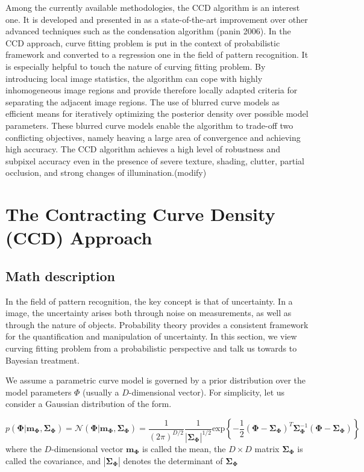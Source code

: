 Among the currently available methodologies, the CCD algorithm is an
interest one. It is developed and presented in as a state-of-the-art
improvement over other advanced techniques such as the condensation
algorithm (panin 2006). In the CCD approach, curve fitting problem is
put in the context of probabilistic framework and converted to a
regression one in the field of pattern recognition. It is especially
helpful to touch the nature of curving fitting problem. By introducing
local image statistics, the algorithm can cope with highly
inhomogeneous image regions and provide therefore locally adapted
criteria for separating the adjacent image regions. The use of blurred
curve models as efficient means for iteratively optimizing the
posterior density over possible model parameters. These blurred curve
models enable the algorithm to trade-off two conflicting objectives,
namely heaving a large area of convergence and achieving high
accuracy. The CCD algorithm achieves a high level of robustness and subpixel
accuracy even in the presence of severe texture, shading, clutter,
partial occlusion, and strong changes of illumination.(modify)



\section{The Contracting Curve Density (CCD) Approach}
\label{sec:sketch}

\subsection{Math description}
\label{sec:md}

In the field of pattern recognition, the key concept is that of
uncertainty. In a image, the uncertainty arises both
through noise on measurements, as well as through the nature of
objects. Probability theory provides a consistent framework for the
quantification and manipulation of uncertainty.  In this section, we
view curving fitting problem from a probabilistic perspective and talk
us towards to Bayesian treatment.

We assume a parametric curve model is governed by a prior distribution
over the model parameters $\Phi$ (usually a $D$-dimensional vector). For simplicity, let us consider a
Gaussian distribution of the form.

\begin{equation}
  \label{eq:1.1}
  p(\mathbf{\Phi} | \mathbf{m}_{\mathbf{\Phi}}, \mathbf{\mathbf{\Sigma}}_{\mathbf{\Phi}}) = \mathcal{N}(\mathbf{\Phi} |
  \mathbf{m}_{\mathbf{\Phi}},\mathbf{\Sigma}_{\mathbf{\Phi}}) =
  \frac{1}{(2\pi )^{D/2}} \frac{1}{|\mathbf{\Sigma}_{\mathbf{\Phi}}|^{1/2}}
\mathrm{exp} \left\{ -\frac{1}{2} (\mathbf{\Phi} -
  \mathbf{\Sigma}_{\mathbf{\Phi}})^T \mathbf{\Sigma}_{\mathbf{\Phi}}^{-1} (\mathbf{\Phi} -
  \mathbf{\Sigma}_{\mathbf{\Phi}}) \right\}
\end{equation}
where the $D$-dimensional vector $\mathbf{m}_{\mathbf{\Phi}}$ is
called the mean, the $D \times D$ matrix
$ \mathbf{\Sigma}_{\mathbf{\Phi}} $ is called
the covariance, and $|\mathbf{\Sigma}_{\mathbf{\Phi}}|$ denotes the
determinant of $\mathbf{\Sigma}_{\mathbf{\Phi}}$

